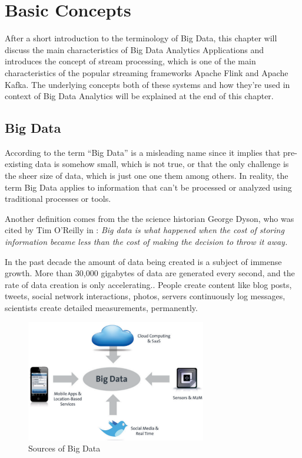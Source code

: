\chapter{Basic Concepts}

After a short introduction to the terminology of Big Data, this chapter will discuss
the main characteristics of Big Data Analytics Applications and introduces the concept of
stream processing, which is one of the main characteristics of the popular streaming
frameworks Apache Flink and Apache Kafka. The underlying concepts both of these systems
and how they're used in context of Big Data Analytics will be explained at the
end of this chapter.

\section{Big Data}

According to \cite{Marz15} the term “Big Data” is a misleading name since it implies that
pre-existing data is somehow small, which is not true, or that the only challenge is the
sheer size of data, which is just one one them among others. In reality, the term Big Data
applies to information that can’t be processed or analyzed using traditional processes or
tools.

Another definition comes from the the science historian George Dyson, who was cited by
Tim O'Reilly in \cite{Dys13}:
\textit{Big data is what happened when the cost of storing information became less than the
cost of making the decision to throw it away.}

In the past decade the amount of data being created is a subject of immense growth.
More than 30,000 gigabytes of data are generated every second, and the rate of data
creation is only accelerating.\cite{Marz15}. People create content like blog posts, tweets, social
network interactions, photos, servers continuously log messages, scientists create detailed
measurements, permanently.

\begin{figure}[H]
	\centering
	\includegraphics[width=0.7\textwidth]{../images/04-sources-of-bigdata.png}
	\caption{Sources of Big Data{\cite{Bitk12}}}
	\label{sources-of-bigdata}
\end{figure}

